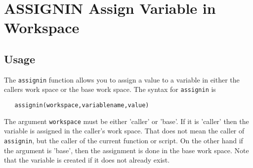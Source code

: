 \section{ASSIGNIN Assign Variable in Workspace}

\subsection{Usage}

The \verb|assignin| function allows you to assign a value to a variable
in either the callers work space or the base work space.  The syntax
for \verb|assignin| is
\begin{verbatim}
   assignin(workspace,variablename,value)
\end{verbatim}
The argument \verb|workspace| must be either 'caller' or 'base'.  If it is
'caller' then the variable is assigned in the caller's work space.
That does not mean the caller of \verb|assignin|, but the caller of the
current function or script.  On the other hand if the argument is 'base',
then the assignment is done in the base work space.  Note that the
variable is created if it does not already exist.
